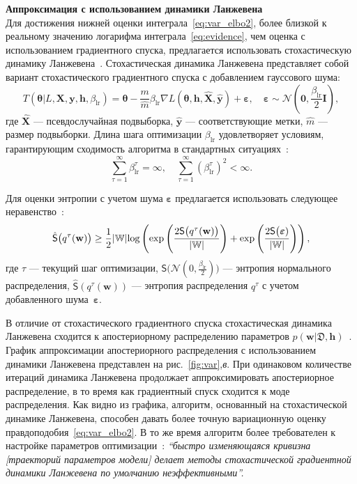 \textbf{Аппроксимация с использованием динамики Ланжевена}\\
Для достижения нижней оценки интеграла~\eqref{eq:var_elbo2}, более близкой к реальному значению логарифма интеграла~\eqref{eq:evidence}, чем оценка с использованием градиентного спуска, предлагается использовать стохастическую динамику Ланжевена~\cite{langevin}. Стохастическая динамика Ланжевена представляет собой вариант стохастического градиентного спуска с добавлением гауссового шума:
\begin{equation}
\label{eq:langevin}
	T( \boldsymbol{\theta}| L,\mathbf{X},  \mathbf{y},  \mathbf{h}, {\beta_{\text{lr}}}) = \boldsymbol{\theta} -\frac{m}{\hat{m}}  \beta_{\text{lr}} \nabla L(\boldsymbol{\theta}, \mathbf{h}, \hat{\mathbf{X}}, \hat{\mathbf{y}})  + \boldsymbol{\varepsilon}, \quad  \boldsymbol{\varepsilon} \sim \mathcal{N}(\mathbf{0}, {\frac{\beta_{\text{lr}}}{2}}\mathbf{I}),
\end{equation}
где $\hat{\mathbf{X}}$ --- псевдослучайная подвыборка, $\hat{\mathbf{y}}$ --- соответствующие метки, $\hat{m}$ --- размер подвыборки. Длина шага оптимизации $\beta_{\text{lr}}$ удовлетворяет  {условиям, гарантирующим сходимость алгоритма в стандартных ситуациях~\cite{langevin}}:
\[
	\sum_{\tau=1}^\infty \beta_{\text{lr}}^\tau = \infty, \quad \sum_{\tau=1}^\infty (\beta_{\text{lr}}^\tau)^2 < \infty.
\]

Для оценки энтропии с учетом шума $\boldsymbol{\varepsilon}$ предлагается использовать следующее неравенство~\cite{entropy,var_grad}:
\[
\hat{\mathsf{S}}\bigl(q^\tau(\mathbf{w})\bigr)   \geq \frac{1}{2}|\mathbb{W}|\textnormal{log}\left(\textnormal{exp}\left(\frac{2\mathsf{S}\bigl(q^\tau(\mathbf{w})\bigr)}{|\mathbb{W}|}\right) + \textnormal{exp}\left(\frac{2\mathsf{S}\bigl( \boldsymbol{\varepsilon})}{|\mathbb{W}|}\right)\right),
\]
{где  $\tau$ --- текущий шаг оптимизации,} $\mathsf{S}\bigl( \mathcal{N}({0}, {\frac{\beta_{\text{lr}}}{2}})\bigr)$ --- энтропия нормального распределения, $\hat{\mathsf{S}}(q^\tau(\mathbf{w}))$ --- энтропия распределения $q^\tau$ с учетом добавленного шума~$\boldsymbol{\varepsilon}$.


В отличие от стохастического градиентного спуска стохастическая динамика Ланжевена сходится к апостериорному распределению параметров $p(\mathbf{w}|\mathfrak{D},\mathbf{h})$~\cite{langevin, langevin_sato}.  График аппроксимации апостериорного распределения с использованием динамики Ланжевена представлен на рис.~\ref{fig:var},\textit{в}. При одинаковом количестве итераций динамика Ланжевена продолжает аппроксимировать апостериорное распределение, в то время как градиентный спуск сходится к моде распределения. {Как видно из графика, алгоритм, основанный на стохастической динамике Ланжевена, способен давать более точную вариационную оценку правдоподобия~\eqref{eq:var_elbo2}. В то же время алгоритм более требователен к настройке параметров оптимизации~\cite{sgld}: \textit{``быстро изменяющаяся кривизна [траекторий параметров модели] делает методы стохастической градиентной динамики Ланжевена по умолчанию неэффективными''.}}




